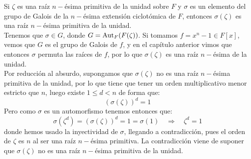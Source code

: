 \begin{ejercicio}
    Si $\zeta$ es una raíz $n-$ésima primitiva de la unidad sobre $F$ y $\sigma$ es un elemento del grupo de Galois de la $n-$ésima extensión ciclotómica de $F$, entonces $\sigma(\zeta)$ es una raíz $n-$ésima primitiva de la unidad.\\

    \noindent
    Tenemos que $\sigma \in G$, donde $G = \operatorname{Aut}_F(F(\zeta))$. Si tomamos $f = x^n-1\in F[x]$, vemos que $G$ es el grupo de Galois de $f$, y en el capítulo anterior vimos que entonces $\sigma$ permuta las raíces de $f$, por lo que $\sigma(\zeta)$ es una raíz $n-$ésima de la unidad.\\

    \noindent
    Por reducción al absurdo, supongamos que $\sigma(\zeta)$ no es una raíz $n-$ésima primitiva de la unidad, por lo que tiene que tener un orden multiplicativo menor estricto que $n$, luego existe $1\leq d < n$ de forma que:
    \begin{equation*}
        {(\sigma(\zeta))}^{d} = 1
    \end{equation*}
    Pero como $\sigma$ es un automorfismo tenemos entonces que:
    \begin{equation*}
        \sigma\left(\zeta^d\right) = {(\sigma(\zeta))}^{d} = 1 = \sigma(1) \quad\Longrightarrow\quad \zeta^d = 1
    \end{equation*}
    donde hemos usado la inyectividad de $\sigma$, llegando a contradicción, pues el orden de $\zeta$ es $n$ al ser una raíz $n-$ésima primitiva. La contradicción viene de suponer que $\sigma(\zeta)$ no es una raíz $n-$ésima primitiva de la unidad.
\end{ejercicio}


